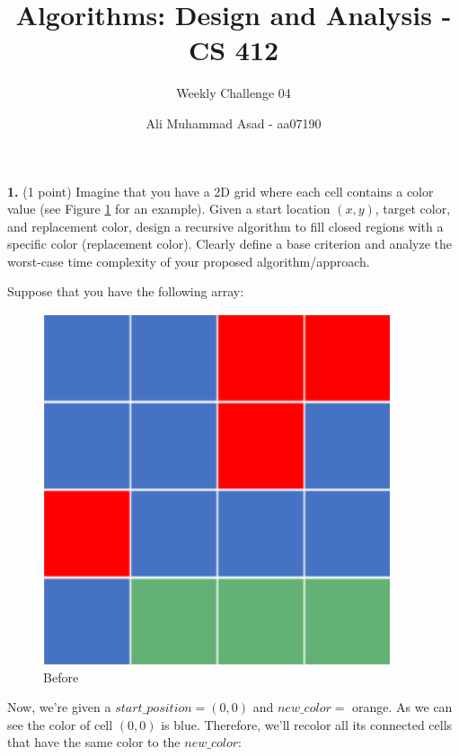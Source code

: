 \documentclass[addpoints]{exam}
\title{Algorithms: Design and Analysis - CS 412 \vspace*{-4mm}}
\author{Weekly Challenge 04}
\date{\vspace*{-4mm} Ali Muhammad Asad - aa07190}
\begin{document}
\maketitle


\begin{questions}
  \question[1]
  \textbf{1.}\; (1 point)
  Imagine that you have a 2D grid where each cell contains a color value (see Figure \hyperref[figure1]{1} for an example). Given a start location $(x, y)$, target color, and replacement color, design a recursive algorithm to fill closed regions with a specific color (replacement color). Clearly define a base criterion and analyze the worst-case time complexity of your proposed algorithm/approach.

  Suppose that you have the following array:
  \begin{figure}[h]
    \centering
    \includegraphics[scale=0.5]{image1.png}
    \caption{Before}
    \label{figure1}
  \end{figure}

  Now, we're given a $start\_position = (0, 0)$ and $new\_color =$ orange. As we can see the color of cell $(0, 0)$ is blue. Therefore, we'll recolor all its connected cells that have the same color to the $new\_color$:


\end{questions}
\end{document}
